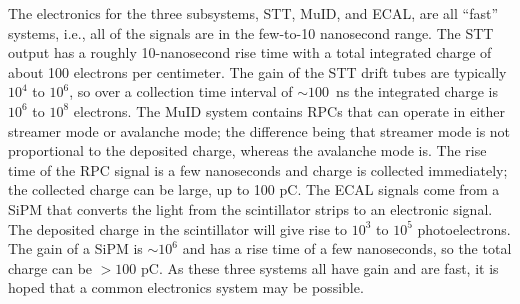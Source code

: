 The electronics for the three subsystems, STT, MuID, and ECAL, are all ``fast'' systems, 
i.e., all of the signals are %
in the few-to-10 nanosecond range.  The STT output has 
a roughly 10-nanosecond rise time with a total integrated charge of about 100 
electrons per centimeter.  The gain of the STT drift tubes are typically $10^4$ to $10^6$, 
so over a collection time interval of $\sim100$~ns
the integrated charge is  $10^6$ to $10^8$ electrons. 
The MuID system contains RPCs that can operate 
in either streamer mode or avalanche mode; the difference 
being that streamer mode is not proportional to 
the deposited charge, whereas the avalanche mode 
is.  The rise time of the RPC signal is a few nanoseconds and charge is 
collected immediately; the collected charge can be large, up to 100 pC.  The ECAL 
signals come from a SiPM that converts the light from the 
scintillator strips to an electronic signal. The deposited charge in the scintillator 
will give rise to $10^3$ to $10^5$ photoelectrons.  The gain of a SiPM is $\sim10^6$ and 
has a rise time of a few nanoseconds, so the total charge can be $>100$ pC. As these 
three systems all have gain and are fast, it is hoped that a 
common electronics system may be possible. 

